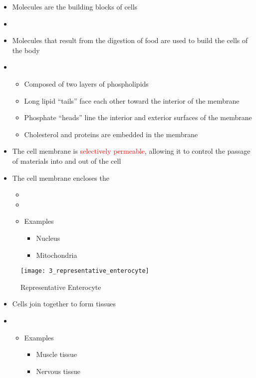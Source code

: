 \documentclass[title={Chapter 3}]{fdsn201notes}
\begin{document}
\begin{itemize}
	\item Molecules are the building blocks of cells
	\item {}
	\item Molecules that result from the digestion of food are used to build the cells of the body
	\item {}
	\begin{itemize}
		\item Composed of two layers of phospholipids
		\item Long lipid ``tails'' face each other toward the interior of the membrane
		\item Phosphate ``heads'' line the interior and exterior surfaces of the membrane
		\item Cholesterol and proteins are embedded in the membrane
	\end{itemize}
	\item The cell membrane is \textcolor{red}{selectively permeable}, allowing it to control the passage of materials into and out of the cell
	\item The cell membrane encloses the
	\begin{itemize}
		\item {}
		\item {}
		\item Examples
		\begin{itemize}
			\item Nucleus
			\item Mitochondria
		\end{itemize}
	\end{itemize}
\end{itemize}

\begin{figure}[H]
	\centering
	\texttt{[image: 3\_representative\_enterocyte]}
	\caption{Representative Enterocyte}
	\label{fig:representative-enterocyte}
\end{figure}

\begin{itemize}
	\item Cells join together to form tissues
	\item {}
	\begin{itemize}
		\item Examples
		\begin{itemize}
			\item Muscle tissue
			\item Nervous tissue
		\end{itemize}
	\end{itemize}
\end{itemize}
\end{document}
